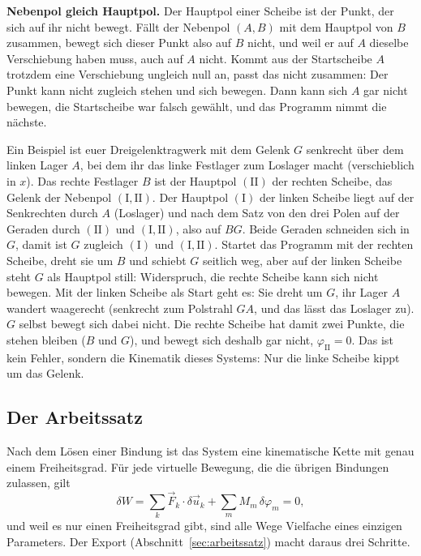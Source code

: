 \textbf{Nebenpol gleich Hauptpol.} Der Hauptpol einer Scheibe ist der Punkt, der sich auf ihr nicht
bewegt. Fällt der Nebenpol $(A,B)$ mit dem Hauptpol von $B$ zusammen, bewegt sich dieser Punkt also
auf $B$ nicht, und weil er auf $A$ dieselbe Verschiebung haben muss, auch auf $A$ nicht. Kommt aus
der Startscheibe $A$ trotzdem eine Verschiebung ungleich null an, passt das nicht zusammen: Der Punkt
kann nicht zugleich stehen und sich bewegen. Dann kann sich $A$ gar nicht bewegen, die Startscheibe
war falsch gewählt, und das Programm nimmt die nächste.

Ein Beispiel ist euer Dreigelenktragwerk mit dem Gelenk $G$ senkrecht über dem linken Lager $A$,
bei dem ihr das linke Festlager zum Loslager macht (verschieblich in $x$). Das rechte Festlager $B$
ist der Hauptpol $(\mathrm{II})$ der rechten Scheibe, das Gelenk der Nebenpol $(\mathrm{I,II})$. Der
Hauptpol $(\mathrm{I})$ der linken Scheibe liegt auf der Senkrechten durch $A$ (Loslager) und nach
dem Satz von den drei Polen auf der Geraden durch $(\mathrm{II})$ und $(\mathrm{I,II})$, also auf
$BG$. Beide Geraden schneiden sich in $G$, damit ist $G$ zugleich $(\mathrm{I})$ und
$(\mathrm{I,II})$. Startet das Programm mit der rechten Scheibe, dreht sie um $B$ und schiebt $G$
seitlich weg, aber auf der linken Scheibe steht $G$ als Hauptpol still: Widerspruch, die rechte
Scheibe kann sich nicht bewegen. Mit der linken Scheibe als Start geht es: Sie dreht um $G$, ihr
Lager $A$ wandert waagerecht (senkrecht zum Polstrahl $GA$, und das lässt das Loslager zu). $G$
selbst bewegt sich dabei nicht. Die rechte Scheibe hat damit zwei Punkte, die stehen bleiben ($B$
und $G$), und bewegt sich deshalb gar nicht, $\varphi_\mathrm{II} = 0$. Das ist kein Fehler,
sondern die Kinematik dieses Systems: Nur die linke Scheibe kippt um das Gelenk.

\subsection{Der Arbeitssatz}\label{sec:mathe-arbeitssatz}

Nach dem Lösen einer Bindung ist das System eine kinematische Kette mit genau einem Freiheitsgrad.
Für jede virtuelle Bewegung, die die übrigen Bindungen zulassen, gilt
\[
  \delta W = \sum_k \vec F_k \cdot \delta\vec u_k + \sum_m M_m\,\delta\varphi_m = 0 ,
\]
und weil es nur einen Freiheitsgrad gibt, sind alle Wege Vielfache eines einzigen Parameters. Der
Export (Abschnitt~\ref{sec:arbeitssatz}) macht daraus drei Schritte.

